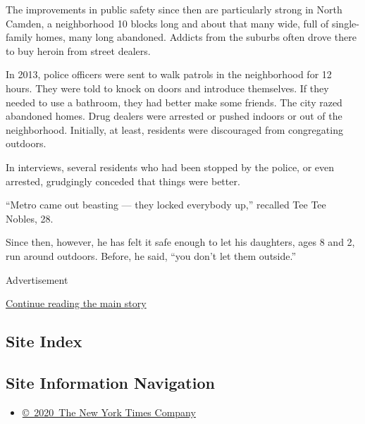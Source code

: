 The improvements in public safety since then are particularly strong in
North Camden, a neighborhood 10 blocks long and about that many wide,
full of single-family homes, many long abandoned. Addicts from the
suburbs often drove there to buy heroin from street dealers.

In 2013, police officers were sent to walk patrols in the neighborhood
for 12 hours. They were told to knock on doors and introduce themselves.
If they needed to use a bathroom, they had better make some friends. The
city razed abandoned homes. Drug dealers were arrested or pushed indoors
or out of the neighborhood. Initially, at least, residents were
discouraged from congregating outdoors.

In interviews, several residents who had been stopped by the police, or
even arrested, grudgingly conceded that things were better.

``Metro came out beasting --- they locked everybody up,'' recalled Tee
Tee Nobles, 28.

Since then, however, he has felt it safe enough to let his daughters,
ages 8 and 2, run around outdoors. Before, he said, ``you don't let them
outside.''

Advertisement

\protect\hyperlink{after-bottom}{Continue reading the main story}

\hypertarget{site-index}{%
\subsection{Site Index}\label{site-index}}

\hypertarget{site-information-navigation}{%
\subsection{Site Information
Navigation}\label{site-information-navigation}}

\begin{itemize}
\tightlist
\item
  \href{https://help.nytimes3xbfgragh.onion/hc/en-us/articles/115014792127-Copyright-notice}{©~2020~The
  New York Times Company}
\end{itemize}

